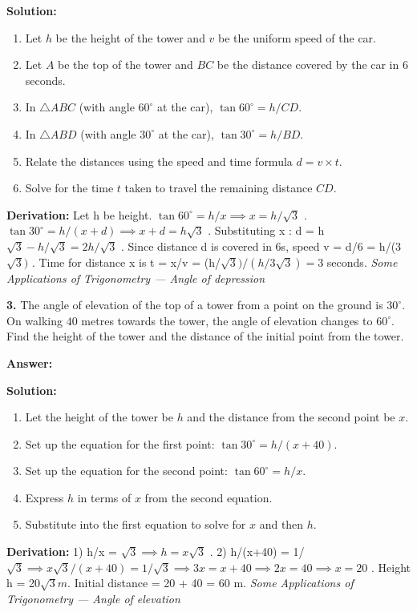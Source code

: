 \documentclass[12pt,a4paper]{exam}
\newcommand{\fitmath}[1]{%
  \sbox{\schmathbox}{$\displaystyle #1$}%
  \ifdim\wd\schmathbox>\linewidth
    \resizebox{\linewidth}{!}{\usebox{\schmathbox}}%
  \else
    \usebox{\schmathbox}%
  \fi}
\begin{document}
\begin{questions}
\textbf{Solution:}
\begin{enumerate}
  \item Let $h$ be the height of the tower and $v$ be the uniform speed of the car.
  \item Let $A$ be the top of the tower and $BC$ be the distance covered by the car in 6 seconds.
  \item In $\triangle ABC$ (with angle $60^\circ$ at the car), $\tan 60^\circ = h/CD$.
  \item In $\triangle ABD$ (with angle $30^\circ$ at the car), $\tan 30^\circ = h/BD$.
  \item Relate the distances using the speed and time formula $d = v \times t$.
  \item Solve for the time $t$ taken to travel the remaining distance $CD$.
\end{enumerate}
\textbf{Derivation:}
Let  h  be height.  $\tan 60^\circ = h/x \implies x = h/\sqrt{3}$ .  $\tan 30^\circ = h/(x+d) \implies x+d = h\sqrt{3}$ . Substituting  x :  d = h$\sqrt{3} - h/\sqrt{3} = 2h/\sqrt{3}$ . Since distance  d  is covered in 6s, speed  v = d/6 = h/(3$\sqrt{3})$ . Time for distance  x  is  t = x/v = (h/$\sqrt{3}) / (h/3\sqrt{3}) = 3$  seconds.
\hfill \textit{Some Applications of Trigonometry — Angle of depression}
\vspace{0.3cm}

\question \textbf{3.} The angle of elevation of the top of a tower from a point on the ground is $30^\circ$. On walking $40$ metres towards the tower, the angle of elevation changes to $60^\circ$. Find the height of the tower and the distance of the initial point from the tower.

\textbf{Answer:}
\begin{center}
\fitmath{\text{Height} = 20\sqrt{3} m, \text{Distance} = 20\sqrt{3} + 40 m}
\end{center}

\textbf{Solution:}
\begin{enumerate}
  \item Let the height of the tower be $h$ and the distance from the second point be $x$.
  \item Set up the equation for the first point: $\tan 30^\circ = h / (x + 40)$.
  \item Set up the equation for the second point: $\tan 60^\circ = h / x$.
  \item Express $h$ in terms of $x$ from the second equation.
  \item Substitute into the first equation to solve for $x$ and then $h$.
\end{enumerate}
\textbf{Derivation:}
1)  h/x = $\sqrt{3} \implies h = x\sqrt{3}$ . 2)  h/(x+40) = 1/$\sqrt{3} \implies x\sqrt{3} / (x+40) = 1/\sqrt{3} \implies 3x = x+40 \implies 2x = 40 \implies x = 20$ . Height  h = 20$\sqrt{3}  m.$ Initial distance  = 20 + 40 = 60  m.
\hfill \textit{Some Applications of Trigonometry — Angle of elevation}
\vspace{0.3cm}


\end{questions}
\end{document}
